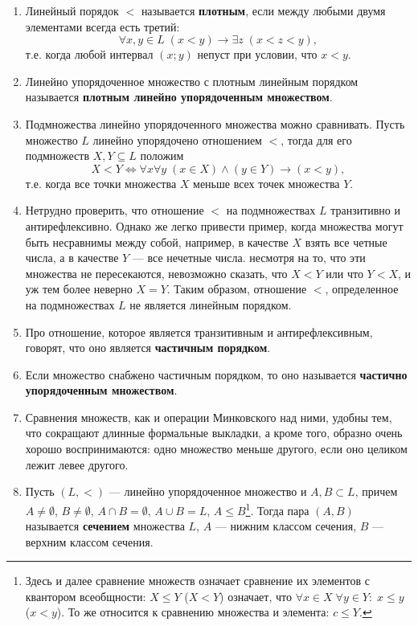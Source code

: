 \begin{enumerate}
\item Линейный порядок $<$ называется \textbf{плотным}, если между любыми двумя элементами всегда есть третий: 
$$
\forall x,y\in L\;(x<y)\to\exists z\; (x<z<y),
$$
т.е. когда любой интервал $(x;y)$ непуст при условии, что $x<y$.
\item Линейно упорядоченное множество с плотным линейным порядком называется \textbf{плотным линейно упорядоченным множеством}.
\item Подмножества линейно упорядоченного множества можно сравнивать. Пусть множество $L$ линейно упорядочено отношением $<$, тогда для его подмножеств $X,Y\subseteq L$ положим
$$
X<Y\Leftrightarrow \forall x\forall y\;(x\in X)\land(y\in Y)\to (x<y),
$$
т.е. когда все точки множества $X$ меньше всех точек множества $Y$.
\item Нетрудно проверить, что отношение $<$ на подмножествах $L$ транзитивно и антирефлексивно. Однако же легко привести пример, когда множества могут быть несравнимы между собой, например, в качестве  $X$ взять все четные числа, а в качестве $Y$ --- все нечетные числа. несмотря на то, что эти множества не пересекаются, невозможно сказать, что $X<Y$ или что $Y<X$, и уж тем более неверно $X=Y$. Таким образом, отношение $<$, определенное на подмножествах $L$ не является линейным порядком.
\item Про отношение, которое является транзитивным и антирефлексивным, говорят, что оно является \textbf{частичным порядком}.
\item Если множество снабжено частичным порядком, то оно называется \textbf{частично упорядоченным множеством}.
\item Сравнения множеств, как и операции Минковского над ними, удобны тем, что сокращают длинные формальные выкладки, а кроме того, образно очень хорошо воспринимаются: одно множество меньше другого, если оно целиком лежит левее другого.

\item Пусть $(L,<)$ --- линейно упорядоченное множество и $A,B\subset L$, причем $A\ne\emptyset$, $B\ne\emptyset$, $A\cap B=\emptyset$, $A\cup B=L$, $A\le B$\footnote{Здесь и далее сравнение множеств означает сравнение их элементов с квантором всеобщности: $X\le Y$ ($X<Y$) означает, что $\forall x \in X\;\forall y\in Y:\; x\le y$ ($x<y$). То же относится к сравнению множества и элемента: $c\le Y$.}. Тогда пара $(A,B)$ называется \textbf{сечением} множества $L$, $A$ --- нижним классом сечения, $B$ --- верхним классом сечения.


\end{enumerate}
